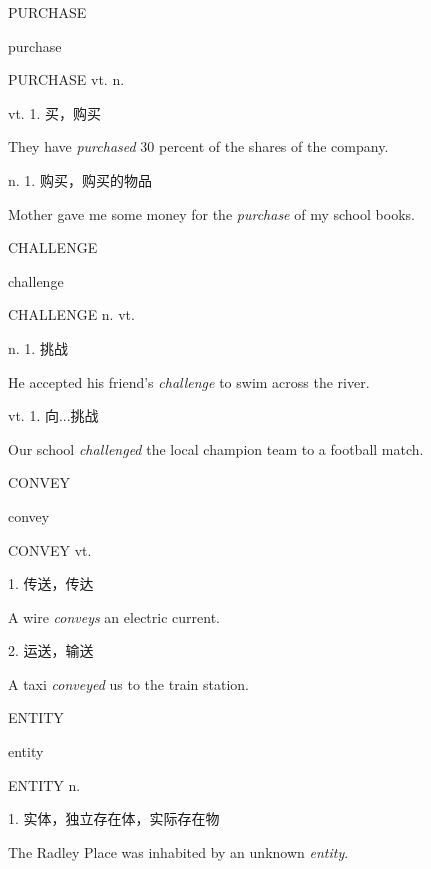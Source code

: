 \begin{flashcard}{
PURCHASE

purchase
}
\begin{center}
PURCHASE vt. n. 
\end{center}
vt. 1. 买，购买

They have \textit{purchased} 30 percent of the shares of the company.

n. 1. 购买，购买的物品

Mother gave me some money for the \textit{purchase} of my school books.

\end{flashcard}
\begin{flashcard}{
CHALLENGE

challenge
}
\begin{center}
CHALLENGE n. vt. 
\end{center}
n. 1. 挑战

He accepted his friend's \textit{challenge} to swim across the river.

vt. 1. 向...挑战

Our school \textit{challenged} the local champion team to a football match.

\end{flashcard}
\begin{flashcard}{
CONVEY

convey
}
\begin{center}
CONVEY vt. 
\end{center}
1. 传送，传达

A wire \textit{conveys} an electric current.

2. 运送，输送

A taxi \textit{conveyed} us to the train station.

\end{flashcard}
\begin{flashcard}{
ENTITY

entity
}
\begin{center}
ENTITY n. 
\end{center}
1. 实体，独立存在体，实际存在物

The Radley Place was inhabited by an unknown \textit{entity}.

\end{flashcard}

